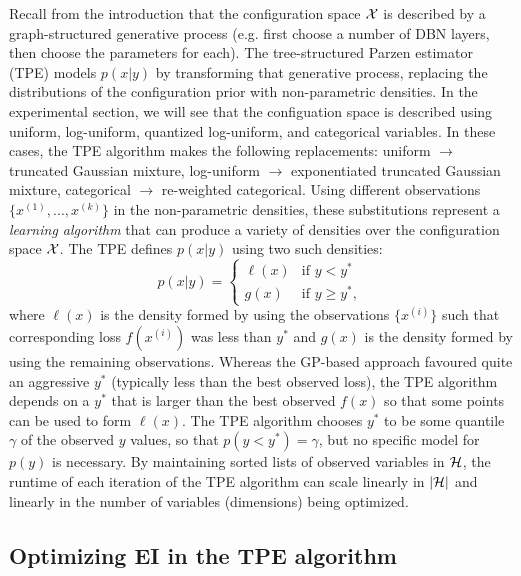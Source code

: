 \documentclass{article}
\begin{document}
Recall from the introduction that the configuration space ${\cal X}$ is described
by a graph-structured generative process
(e.g. first choose a number of DBN layers, then choose the parameters for each).
The tree-structured Parzen estimator (TPE) models $p(x|y)$ by
transforming that generative process, replacing the distributions of the configuration prior
with non-parametric densities.
In the experimental section, we will see that the configuation space is described using
uniform, log-uniform, quantized log-uniform, and categorical variables.
In these cases, the TPE algorithm makes the following replacements:
uniform $\rightarrow$ truncated Gaussian mixture,
log-uniform $\rightarrow$ exponentiated truncated Gaussian mixture,
categorical $\rightarrow$ re-weighted categorical.
Using different observations $\{x^{(1)},...,x^{(k)}\}$ in the non-parametric densities, these substitutions represent a {\em learning algorithm}
that can produce a variety of densities over the configuration space ${\cal X}$. 
The TPE defines $p(x|y)$ using two such densities:
\begin{equation}
p(x|y) = \begin{cases}
   \ell(x) & \text{if $y < y^*$} \\
   g(x) & \text{if $y \geq y^*$},
   \end{cases}
\end{equation}
where $\ell(x)$ is the density formed by using the observations $\{x^{(i)}\}$ such that corresponding loss $f(x^{(i)})$ was less than $y^*$
and $g(x)$ is the density formed by using the remaining observations.
Whereas the GP-based approach favoured quite an aggressive $y^*$ (typically less than the best observed loss), the TPE
algorithm depends on a $y^*$ that is larger than the best observed $f(x)$ so that some points can be used to form $\ell(x)$.
The TPE algorithm chooses $y^*$ to be some quantile $\gamma$ of the observed $y$ values,
so that $p(y < y^*) = \gamma$, but no specific model for $p(y)$ is necessary.
By maintaining sorted lists of observed variables in ${\cal H}$, the runtime of
each iteration of the TPE algorithm can scale linearly in $|{\cal H}|$ and linearly in
the number of variables (dimensions) being optimized.


\subsection{Optimizing EI in the TPE algorithm}
\end{document}
